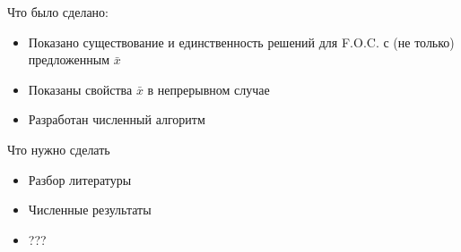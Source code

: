 \documentclass[unicode]{beamer}
\begin{document}
\begin{frame}
	Что было сделано:
	\begin{itemize}
	\item Показано существование и единственность решений для F.O.C.  с (не только) предложенным $\bar{x}$
	\item Показаны свойства $\bar{x}$ в непрерывном случае
	\item Разработан численный алгоритм
	\end{itemize}
\end{frame}

\begin{frame}
	 Что нужно сделать
	 \begin{itemize}
	 \item Разбор литературы
	 \item Численные результаты
	 \item ???
	 \end{itemize}
\end{frame}
\end{document}
